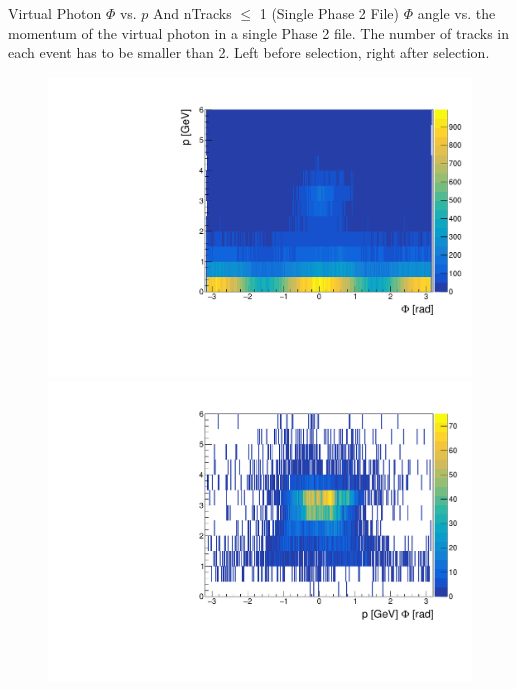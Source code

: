 \documentclass[10pt]{beamer}
\begin{document}
\begin{frame}{Virtual Photon $\Phi$ vs. $p$ And nTracks $\leq$ 1 (Single Phase 2 File)}
	$\Phi$ angle vs. the momentum of the virtual photon in a single Phase 2 file. The number of tracks in each event has to be smaller than 2. Left before selection, right after selection.
	
	\begin{figure}
		\centering
		\begin{minipage}{.5\textwidth}
			\centering
			\includegraphics[width=\textwidth]{gg/data/PhiMgg_BS_nT1}
			
		\end{minipage}%
		\begin{minipage}{.5\textwidth}
			\centering
			\includegraphics[width=\textwidth]{gg/data/PhiMgg_AS_nT1}
			
		\end{minipage}
	\end{figure}
	
	
	
\end{frame}
\end{document}
